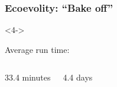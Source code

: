 \begin{frame}[t]
    \frametitle{Ecoevolity: ``Bake off''}
    \begin{uncoverenv}<4->
    \begin{center}
    Average run time:
    \begin{columns}
        \begin{center}
        33.4 minutes
        \end{center}
        \begin{center}
        4.4 days
        \end{center}
    \end{columns}
    \end{center}
    \end{uncoverenv}
\end{frame}
